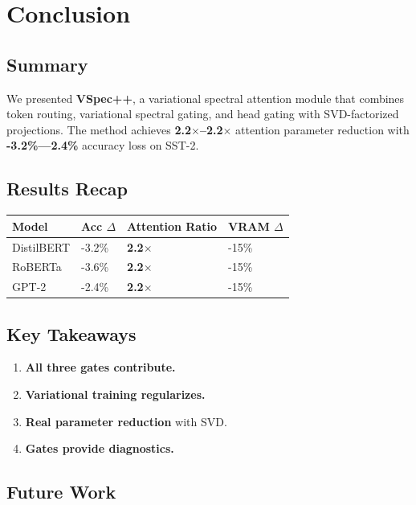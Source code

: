 \section{Conclusion}

\subsection{Summary}

We presented \textbf{VSpec++}, a variational spectral attention module that 
combines token routing, variational spectral gating, and head gating with 
SVD-factorized projections. The method achieves \textbf{2.2$\times$--2.2$\times$} 
attention parameter reduction with \textbf{-3.2\%---2.4\%} accuracy 
loss on SST-2.

\subsection{Results Recap}

\begin{table}[H]
\centering
\small
\begin{tabular}{llll}
\toprule
\textbf{Model} & \textbf{Acc $\Delta$} & \textbf{Attention Ratio} & \textbf{VRAM $\Delta$} \\
\midrule
DistilBERT & -3.2\% & \textbf{2.2$\times$} & -15\% \\
RoBERTa & -3.6\% & \textbf{2.2$\times$} & -15\% \\
GPT-2 & -2.4\% & \textbf{2.2$\times$} & -15\% \\
\bottomrule
\end{tabular}
\end{table}

\subsection{Key Takeaways}

\begin{enumerate}
\item \textbf{All three gates contribute.}
\item \textbf{Variational training regularizes.}
\item \textbf{Real parameter reduction} with SVD.
\item \textbf{Gates provide diagnostics.}

\end{enumerate}
\subsection{Future Work}

